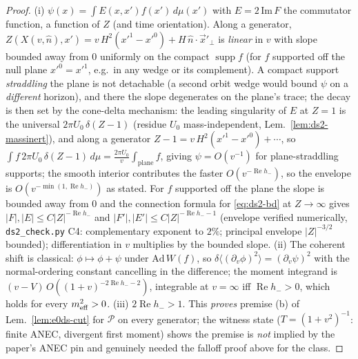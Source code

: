 \begin{proof}
(i) $\psi(x)=\int E(x,x')f(x')\,d\mu(x')$ with $E=2\,\mathrm{Im}\,F$
the commutator function, a function of $Z$ (and time orientation).
Along a generator, $Z(X(v,\hat n),x')=v\,H^2(x'^1-x'^0)+H\,\hat
n\cdot\vec x'_\perp$ is \emph{linear} in $v$ with slope bounded away
from $0$ uniformly on the compact $\operatorname{supp}f$ (for $f$
supported off the null plane $x'^0=x'^1$, e.g.\ in any wedge or its
complement). A compact support \emph{straddling} the plane is not
detachable (a second orbit wedge would bound $\psi$ on a
\emph{different} horizon), and there the slope degenerates on the
plane's trace; the decay is then set by the cone-delta mechanism:
the leading singularity of $E$ at $Z=1$ is the universal
$2\pi U_0\,\delta(Z-1)$ (residue $U_0$ mass-independent,
Lem.~\ref{lem:ds2-massinert}), and along a generator $Z-1=v\,H^2
(x'^1-x'^0)+\cdots$, so
$\int f\,2\pi U_0\,\delta(Z-1)\,d\mu
=\tfrac{2\pi U_0}{v}\!\int_{\text{plane}}\!f$, giving
$\psi=O(v^{-1})$ for plane-straddling supports; the smooth interior
contributes the faster $O(v^{-\operatorname{Re}h_-})$, so the
envelope is $O(v^{-\min(1,\operatorname{Re}h_-)})$ as stated.
For $f$ supported off the plane the slope is bounded away from $0$
and the connection formula for \eqref{eq:ds2-bd} at $Z\to\infty$ gives
$|F|,|E|\le C|Z|^{-\operatorname{Re}h_-}$ and $|F'|,|E'|\le
C|Z|^{-\operatorname{Re}h_--1}$ (envelope verified numerically,
\texttt{ds2\_check.py} C4: complementary exponent to $2\%$;
principal envelope $|Z|^{-3/2}$ bounded); differentiation in $v$
multiplies by the bounded slope. (ii) The coherent shift is
classical: $\phi\mapsto\phi+\psi$ under $\mathrm{Ad}\,W(f)$, so
$\delta\langle(\partial_v\phi)^2\rangle=(\partial_v\psi)^2$ with the
normal-ordering constant cancelling in the difference; the moment
integrand is $(v-V)\,O((1+v)^{-2\operatorname{Re}h_--2})$, integrable
at $v=\infty$ iff $\operatorname{Re}h_->0$, which holds for every
$m^2_{\rm eff}>0$. (iii) $2\operatorname{Re}h_->1$.
This \emph{proves} premise (b) of Lem.~\ref{lem:e0ds-cut} for
$\mathcal P$ on every generator; the witness state
($T=(1+v^2)^{-1}$: finite ANEC, divergent first moment) shows the
premise is \emph{not} implied by the paper's ANEC pin and genuinely
needed the falloff proof above for the class.
\end{proof}

